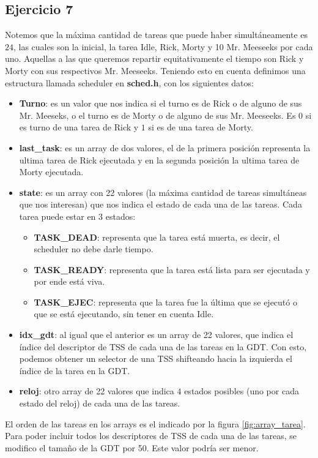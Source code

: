 \documentclass[a4paper]{article}
\begin{document}
\subsection{Ejercicio 7}
\justify
Notemos que la máxima cantidad de tareas que puede haber simultáneamente es $24$, las cuales son la inicial, la tarea Idle, Rick, Morty y 10 Mr. Meeseeks por cada uno. Aquellas a las que queremos repartir equitativamente el tiempo son Rick y Morty con sus respectivos Mr. Meeseeks. Teniendo esto en cuenta definimos una estructura llamada scheduler en \textbf{sched.h}, con los siguientes datos:
\begin{itemize}
	\item \textbf{Turno}: es un valor que nos indica si el turno es de Rick o de alguno de sus Mr. Meeseks, o el turno es de Morty o de alguno de sus Mr. Meeseeks. Es $0$ si es turno de una tarea de Rick y $1$ si es de una tarea de Morty.
	\item \textbf{last_task}: es un array de dos valores, el de la primera posición representa la ultima tarea de Rick ejecutada y en la segunda posición la ultima tarea de Morty ejecutada.
	\item \textbf{state}: es un array con 22 valores (la máxima cantidad de tareas simultáneas que nos interesan) que nos indica el estado de cada una de las tareas. Cada tarea puede estar en $3$ estados:
	\begin{itemize}
		\item \textbf{TASK_DEAD}: representa que la tarea está muerta, es decir, el scheduler no debe darle tiempo.
		\item \textbf{TASK_READY}: representa que la tarea está lista para ser ejecutada y por ende está viva.
		\item \textbf{TASK_EJEC}: representa que la tarea fue la última que se ejecutó o que se está ejecutando, sin tener en cuenta Idle.
	\end{itemize} 
	\item \textbf{idx_gdt}: al igual que el anterior es un array de 22 valores, que indica el índice del descriptor de TSS de cada una de las tareas en la GDT. Con esto, podemos obtener un selector de una TSS shifteando hacia la izquierda el índice de la tarea en la GDT.
	\item \textbf{reloj}: otro array de 22 valores que indica $4$ estados posibles (uno por cada estado del reloj) de cada una de las tareas.   
\end{itemize}
El orden de las tareas en los arrays es el indicado por la figura \ref{fig:array_tarea}. Para poder incluir todos los descriptores de TSS de cada una de las tareas, se modifico el tamaño de la GDT por 50. Este valor podría ser menor.
\end{document}
